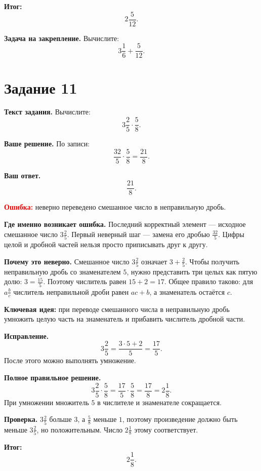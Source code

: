 \documentclass[12pt,a4paper]{article}
\begin{document}
\textcolor{teal!60!black}{\textbf{Итог:}}
\[
\boxed{2\frac{5}{12}}.
\]

\textbf{Задача на закрепление.}
Вычислите:
\[
3\frac{1}{6}+\frac{5}{12}.
\]

\newpage
{}\label{task:11}
\section*{Задание 11}

\textbf{Текст задания.}
Вычислите:
\[
3\frac{2}{5}\cdot\frac{5}{8}.
\]

\textbf{Ваше решение.}
По записи:
\[
\frac{32}{5}\cdot\frac{5}{8}=\frac{21}{8}.
\]

\textbf{Ваш ответ.}
\[
\frac{21}{8}.
\]

\textcolor{red}{\textbf{Ошибка:}} неверно переведено смешанное число в неправильную дробь.

\textbf{Где именно возникает ошибка.}
Последний корректный элемент --- исходное смешанное число $3\frac{2}{5}$. Первый неверный шаг --- замена его дробью $\frac{32}{5}$. Цифры целой и дробной частей нельзя просто приписывать друг к другу.

\textbf{Почему это неверно.}
Смешанное число $3\frac{2}{5}$ означает $3+\frac25$. Чтобы получить неправильную дробь со знаменателем $5$, нужно представить три целых как пятую долю: $3=\frac{15}{5}$. Поэтому числитель равен $15+2=17$. Общее правило таково: для $a\frac{b}{c}$ числитель неправильной дроби равен $ac+b$, а знаменатель остаётся $c$.

\textcolor{blue!60!black}{\textbf{Ключевая идея:}} при переводе смешанного числа в неправильную дробь умножить целую часть на знаменатель и прибавить числитель дробной части.

\textbf{Исправление.}
\[
3\frac{2}{5}=\frac{3\cdot5+2}{5}=\frac{17}{5}.
\]
После этого можно выполнять умножение.

\textbf{Полное правильное решение.}
\[
3\frac{2}{5}\cdot\frac{5}{8}
=\frac{17}{5}\cdot\frac{5}{8}
=\frac{17}{8}
=2\frac{1}{8}.
\]
При умножении множитель $5$ в числителе и знаменателе сокращается.

\textbf{Проверка.}
$3\frac25$ больше $3$, а $\frac58$ меньше $1$, поэтому произведение должно быть меньше $3\frac25$, но положительным. Число $2\frac18$ этому соответствует.

\textcolor{teal!60!black}{\textbf{Итог:}}
\[
\boxed{2\frac{1}{8}}.
\]
\end{document}
